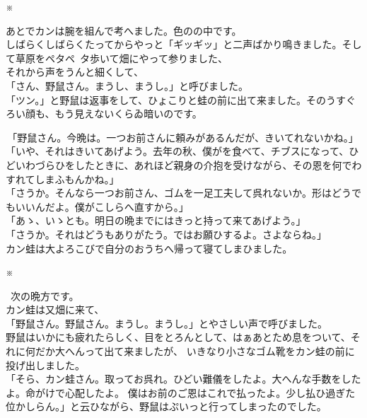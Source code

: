\documentclass[
a4paper,
10pt,
book]
{tarticle}
\begin{document}
\nolinenumbers
\indent \indent \indent \indent \indent \indent \indent \indent \indent \indent ※


  \indent あとでカンは腕を組んで考へました。色のの中です。\\
  しばらくしばらくたってからやっと「ギッギッ」と二声ばかり鳴きました。そして草原をペタペ~タ歩いて畑にやって参りました、\\
  \indent それから声をうんと細くして、\\
  「さん、野鼠さん。まうし、まうし。」と呼びました。\\
  「ツン。」と野鼠は返事をして、ひょこりと蛙の前に出て来ました。そのうすぐろい顔も、もう見えないくらゐ暗いのです。


\newpage
\setcounter{page}{6}
\thispagestyle{fancy}

\noindent \,「野鼠さん。今晩は。一つお前さんに頼みがあるんだが、きいてれないかね。」\\
「いや、それはきいてあげよう。去年の秋、僕がを食べて、チブスになって、ひどいわづらひをしたときに、あれほど親身の介抱を受けながら、その恩を何でわすれてしまふもんかね。」\\
「さうか。そんなら一つお前さん、ゴムを一足工夫して呉れないか。形はどうでもいいんだよ。僕がこしらへ直すから。」\\
「あゝ、いゝとも。明日の晩までにはきっと持って来てあげよう。」\\
「さうか。それはどうもありがたう。ではお願ひするよ。さよならね。」\\
\indent カン蛙は大よろこびで自分のおうちへ帰って寝てしまひました。


\nolinenumbers
\indent \indent \indent \indent \indent \indent \indent \indent \indent \indent ※


\noindent \, 次の晩方です。\\
\indent カン蛙は又畑に来て、\\
「野鼠さん。野鼠さん。まうし。まうし。」とやさしい声で呼びました。\\
\indent 野鼠はいかにも疲れたらしく、目をとろんとして、はぁあとため息をついて、それに何だか大へんって出て来ましたが、
いきなり小さなゴム靴をカン蛙の前に投げ出しました。\\
「そら、カン蛙さん。取ってお呉れ。ひどい難儀をしたよ。大へんな手数をしたよ。命がけで心配したよ。
僕はお前のご恩はこれで払ったよ。少し払ひ過ぎた位かしらん。」と云ひながら、野鼠はぷいっと行ってしまったのでした。
\end{document}
